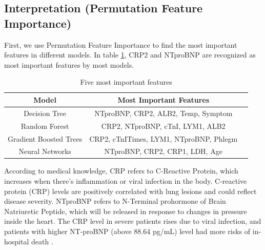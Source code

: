 
\subsection{Interpretation (Permutation Feature Importance)}

First, we use  Permutation Feature Importance to find the most important features in different models. In table \ref{tab:important_feature}, CRP2 and NTproBNP are recognized as most important features by most models.

\begin{table}[H]
\centering
\begin{tabular}{@{}ccc@{}}
\toprule
Model                   & Most Important Features \\ \midrule
Decision Tree           & NTproBNP, CRP2, ALB2, Temp, Symptom      \\
Random Forest           & CRP2, NTproBNP, cTnI, LYM1, ALB2         \\
Gradient Boosted Trees  & CRP2, cTnITimes, LYM1, NTproBNP, Phlegm  \\
Neural Networks         & NTproBNP, CRP2, CRP1, LDH, Age           \\  \bottomrule
\end{tabular}
\caption{Five most important features}
\label{tab:important_feature}
\end{table}

According to medical knowledge, CRP refers to C-Reactive Protein, which increases when there's inflammation or viral infection in the body. C-reactive protein (CRP) levels are positively correlated with lung lesions and could reflect disease severity\citep{WANG2020332}. NTproBNP refers to N-Terminal prohormone of Brain Natriuretic Peptide, which will be released in response to changes in pressure inside the heart. The CRP level in severe patients rises due to viral infection, and patients with higher NT-proBNP (above 88.64 pg/mL) level had more risks of in-hospital death \citep{Gao2020.03.07.20031575}.



